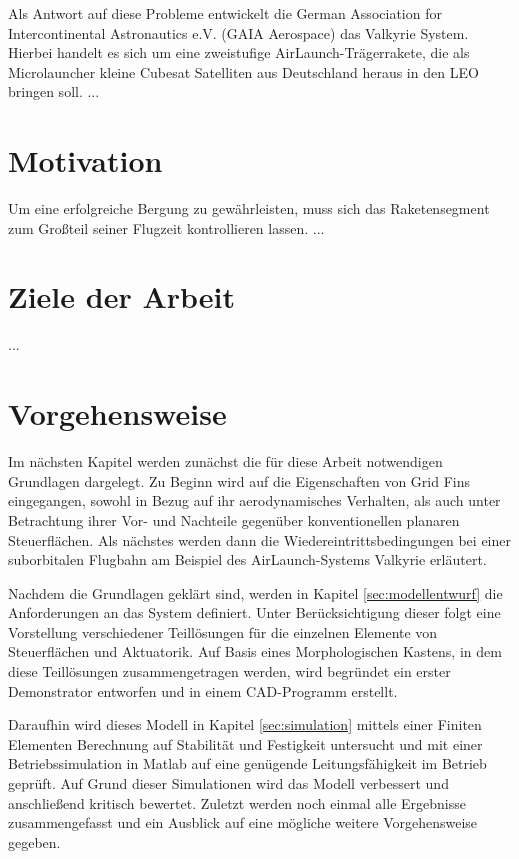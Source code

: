 Als Antwort auf diese Probleme entwickelt die German Association for Intercontinental Astronautics e.V. (GAIA Aerospace) das Valkyrie System. Hierbei handelt es sich um eine zweistufige AirLaunch-Trägerrakete, die als Microlauncher kleine Cubesat Satelliten aus Deutschland heraus in den LEO bringen soll.
...


\section{Motivation}
Um eine erfolgreiche Bergung zu gewährleisten, muss sich das Raketensegment zum Großteil seiner Flugzeit kontrollieren lassen.  ...

\section{Ziele der Arbeit}
...

\section{Vorgehensweise}
Im nächsten Kapitel werden zunächst die für diese Arbeit notwendigen Grundlagen dargelegt. Zu Beginn wird auf die Eigenschaften von Grid Fins eingegangen, sowohl in Bezug auf ihr aerodynamisches Verhalten, als auch unter Betrachtung ihrer Vor- und Nachteile gegenüber konventionellen planaren Steuerflächen. Als nächstes werden dann die Wiedereintrittsbedingungen bei einer suborbitalen Flugbahn am Beispiel des AirLaunch-Systems Valkyrie erläutert.

Nachdem die Grundlagen geklärt sind, werden in Kapitel \ref{sec:modellentwurf} die Anforderungen an das System definiert. Unter Berücksichtigung dieser folgt eine Vorstellung verschiedener Teillösungen für die einzelnen Elemente von Steuerflächen und Aktuatorik. Auf Basis eines Morphologischen Kastens, in dem diese Teillösungen zusammengetragen werden, wird begründet ein erster Demonstrator entworfen und in einem CAD-Programm erstellt.

Daraufhin wird dieses Modell in Kapitel \ref{sec:simulation} mittels einer Finiten Elementen Berechnung auf Stabilität und Festigkeit untersucht und mit einer Betriebssimulation in Matlab auf eine genügende
Leitungsfähigkeit im Betrieb geprüft. Auf Grund dieser Simulationen wird das Modell verbessert und anschließend kritisch bewertet.
Zuletzt werden noch einmal alle Ergebnisse zusammengefasst und ein Ausblick auf eine mögliche weitere Vorgehensweise gegeben.
